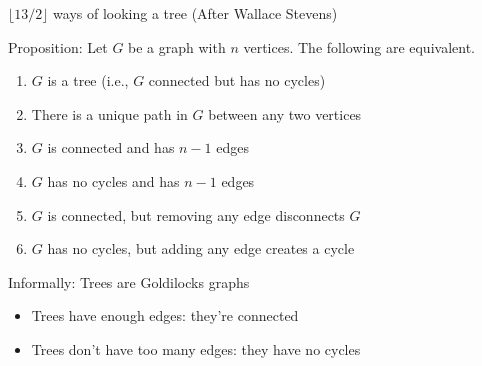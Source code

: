 \documentclass{beamer}
\begin{document}
\begin{frame}{$\lfloor 13/2\rfloor$ ways of looking a tree (After Wallace Stevens)}
  \begin{block}{Proposition:} Let $G$ be a graph with $n$ vertices.  The following are equivalent.
    \begin{enumerate}
    \item $G$ is a tree (i.e., $G$ connected but has no cycles)
    \item There is a unique path in $G$ between any two vertices
    \item $G$ is connected and has $n-1$ edges
    \item $G$ has no cycles and has $n-1$ edges
    \item $G$ is connected, but removing any edge disconnects $G$
    \item $G$ has no cycles, but adding any edge creates a cycle
      \end{enumerate}
  \end{block}
  \begin{block}{Informally: Trees are Goldilocks graphs}
    \begin{itemize}
\item    Trees have enough edges: they're connected \\
\item    Trees don't have too many edges: they have no cycles
  \end{itemize}
\end{block}

\end{frame}
\end{document}
